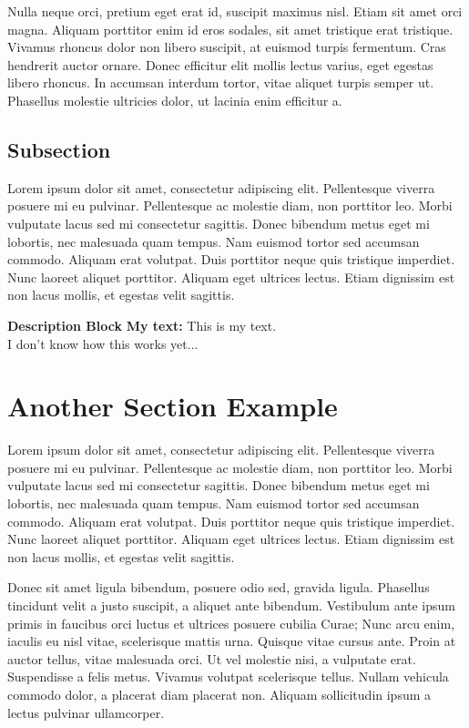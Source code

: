 \documentclass{arcanum}
\begin{document}
Nulla neque orci, pretium eget erat id, suscipit maximus nisl. Etiam sit amet
orci magna. Aliquam porttitor enim id eros sodales, sit amet tristique erat
tristique. Vivamus rhoncus dolor non libero suscipit, at euismod turpis fermentum.
Cras hendrerit auctor ornare. Donec efficitur elit mollis lectus varius, eget
egestas libero rhoncus. In accumsan interdum tortor, vitae aliquet turpis semper
ut. Phasellus molestie ultricies dolor, ut lacinia enim efficitur a.

\subsection{Subsection}
Lorem ipsum dolor sit amet, consectetur adipiscing elit. Pellentesque viverra
posuere mi eu pulvinar. Pellentesque ac molestie diam, non porttitor leo. Morbi
vulputate lacus sed mi consectetur sagittis. Donec bibendum metus eget mi lobortis,
nec malesuada quam tempus. Nam euismod tortor sed accumsan commodo. Aliquam erat
volutpat. Duis porttitor neque quis tristique imperdiet. Nunc laoreet aliquet
porttitor. Aliquam eget ultrices lectus. Etiam dignissim est non lacus mollis,
et egestas velit sagittis.

\descriptionblock
{
  \textbf{Description Block}
}
{
  \textbf{My text:} This is my text. \\
  I don't know how this works yet...
}

\section{Another Section Example}
Lorem ipsum dolor sit amet, consectetur adipiscing elit. Pellentesque viverra
posuere mi eu pulvinar. Pellentesque ac molestie diam, non porttitor leo. Morbi
vulputate lacus sed mi consectetur sagittis. Donec bibendum metus eget mi lobortis,
nec malesuada quam tempus. Nam euismod tortor sed accumsan commodo. Aliquam erat
volutpat. Duis porttitor neque quis tristique imperdiet. Nunc laoreet aliquet
porttitor. Aliquam eget ultrices lectus. Etiam dignissim est non lacus mollis,
et egestas velit sagittis.

Donec sit amet ligula bibendum, posuere odio sed, gravida ligula. Phasellus tincidunt
velit a justo suscipit, a aliquet ante bibendum. Vestibulum ante ipsum primis in
faucibus orci luctus et ultrices posuere cubilia Curae; Nunc arcu enim, iaculis
eu nisl vitae, scelerisque mattis urna. Quisque vitae cursus ante. Proin at auctor
tellus, vitae malesuada orci. Ut vel molestie nisi, a vulputate erat. Suspendisse a
felis metus. Vivamus volutpat scelerisque tellus. Nullam vehicula commodo dolor,
a placerat diam placerat non. Aliquam sollicitudin ipsum a lectus pulvinar ullamcorper.
\end{document}

